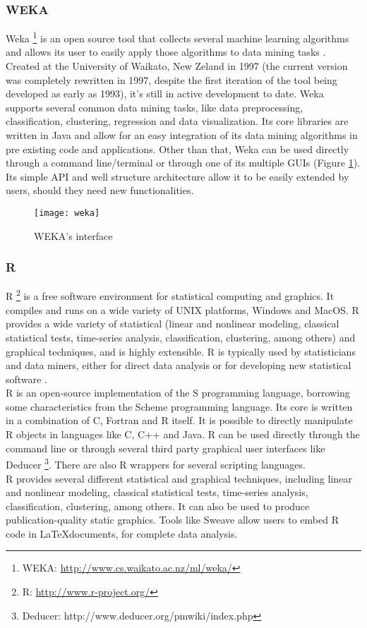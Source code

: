 \subsubsection{WEKA}
Weka \footnote{WEKA: \url{http://www.cs.waikato.ac.nz/ml/weka/}} is an open source tool that collects several machine learning algorithms and allows its user to easily apply those algorithms to data mining tasks \cite{han2006data}. Created at the University of Waikato, New Zeland in 1997 (the current version was completely rewritten in 1997, despite the first iteration of the tool being developed as early as 1993), it's still in active development to date. Weka supports several common data mining tasks, like data preprocessing, classification, clustering, regression and data visualization. Its core libraries are written in Java and allow for an easy integration of its data mining algorithms in pre existing code and applications. Other than that, Weka can be used directly through a command line/terminal or through one of its multiple GUIs (Figure \ref{fig:weka}). Its simple API and well structure architecture allow it to be easily extended by users, should they need new functionalities.

\begin{figure}[htb]
  \begin{center}
    \leavevmode
    \texttt{[image: weka]}
	\caption{WEKA's interface}
    \label{fig:weka}
  \end{center}
\end{figure}

\subsubsection{R}
R \footnote{R: \url{http://www.r-project.org/}} is a free software environment for statistical computing and graphics. It compiles and runs on a wide variety of UNIX platforms, Windows and MacOS. R provides a wide variety of statistical (linear and nonlinear modeling, classical statistical tests, time-series analysis, classification, clustering, among others) and graphical techniques, and is highly extensible.  R is typically used by statisticians and data miners, either for direct data analysis or for developing new statistical software \cite{fox2005using}.\\
R is an open-source implementation of the S programming language, borrowing some characteristics from the Scheme programming language. Its core is written in a combination of C, Fortran and R itself. It is possible to directly manipulate R objects in languages like C, C++ and Java. R can be used directly through the command line or through several third party graphical user interfaces like Deducer \footnote{Deducer: http://www.deducer.org/pmwiki/index.php}. There are also R wrappers for several scripting languages.\\
R provides several different statistical and graphical techniques, including linear and nonlinear modeling, classical statistical tests, time-series analysis, classification, clustering, among others. It can also be used to produce publication-quality static graphics. Tools like Sweave \cite{leisch2002sweave} allow users to embed R code in \LaTeX documents, for complete data analysis.

